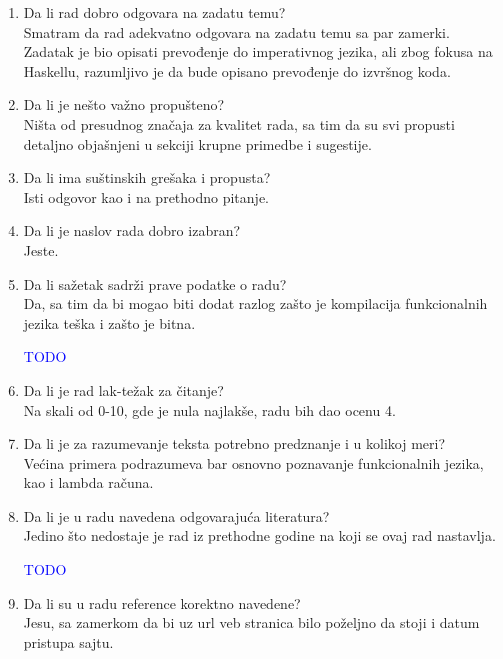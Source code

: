 \documentclass[a4paper]{report}
\newcommand{\odgovor}[1]{\textcolor{blue}{#1}}
\begin{document}
	\begin{enumerate}
		\item Da li rad dobro odgovara na zadatu temu?\\
		Smatram da rad adekvatno odgovara na zadatu temu sa par zamerki. Zadatak je bio opisati prevođenje do imperativnog jezika, ali zbog fokusa na Haskellu, razumljivo je da bude opisano prevođenje do izvršnog koda.
		
		\item Da li je nešto važno propušteno?\\
		Ništa od presudnog značaja za kvalitet rada, sa tim da su svi propusti detaljno objašnjeni u sekciji krupne primedbe i sugestije.
		
		\item Da li ima suštinskih grešaka i propusta?\\
		Isti odgovor kao i na prethodno pitanje.
		
		\item Da li je naslov rada dobro izabran?\\
		Jeste.
		
		\item Da li sažetak sadrži prave podatke o radu?\\
		Da, sa tim da bi mogao biti dodat razlog zašto je kompilacija funkcionalnih jezika teška i zašto je bitna.
		
		\odgovor{TODO}
		
		\item Da li je rad lak-težak za čitanje?\\
		Na skali od 0-10, gde je nula najlakše, radu bih dao ocenu 4.
		
		\item Da li je za razumevanje teksta potrebno predznanje i u kolikoj meri?\\
		Većina primera podrazumeva bar osnovno poznavanje funkcionalnih jezika, kao i lambda računa.
		
		\item Da li je u radu navedena odgovarajuća literatura?\\
		Jedino što nedostaje je rad iz prethodne godine na koji se ovaj rad nastavlja.
		
		\odgovor{TODO}
		
		\item Da li su u radu reference korektno navedene?\\
		Jesu, sa zamerkom da bi uz url veb stranica bilo poželjno da stoji i datum pristupa sajtu.
		

\end{enumerate}
\end{document}
